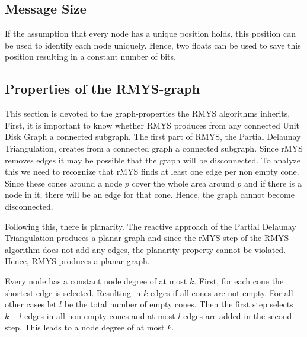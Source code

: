 \subsection{Message Size}
If the assumption that every node has a unique position holds, this position can be used to identify each node uniquely.
Hence, two floats can be used to save this position resulting in a constant number of bits.

\subsection{Properties of the RMYS-graph}
This section is devoted to the graph-properties the RMYS algorithms inherits.
First, it is important to know whether RMYS produces from any connected Unit Disk Graph a connected subgraph.
The first part of RMYS, the Partial Delaunay Triangulation, creates from a connected graph a connected subgraph.
Since rMYS removes edges it may be possible that the graph will be disconnected.
To analyze this we need to recognize that rMYS finds at least one edge per non empty cone.
Since these cones around a node $p $ cover the whole area around $p $ and if there is a node in it, there will be an edge for that cone. %
Hence, the graph cannot become disconnected. 

Following this, there is planarity.
The reactive approach of the Partial Delaunay Triangulation produces a planar graph and since the rMYS step of the RMYS-algorithm does not add any edges, the planarity property cannot be violated.
Hence, RMYS produces a planar graph.

Every node has a constant node degree of at most $k $.
First, for each cone the shortest edge is selected.
Resulting in $k $ edges if all cones are not empty.
For all other cases let $l $ be the total number of empty cones.
Then the first step selects $k-l $ edges in all non empty cones and at most $l $ edges are added in the second step.
This leads to a node degree of at most $k $.

